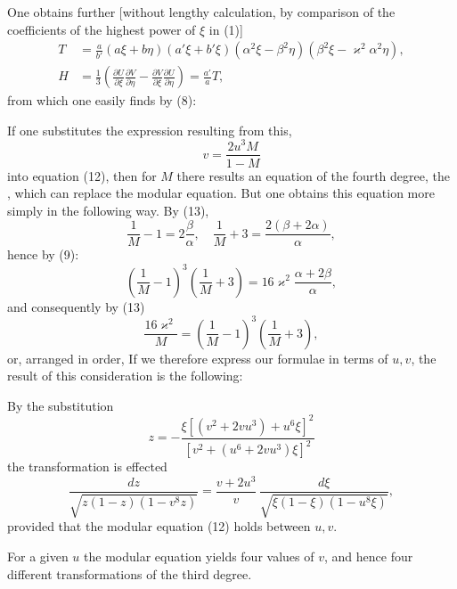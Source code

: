 One obtains further [without lengthy calculation, by comparison of the coefficients of the highest power of $\xi$ in (1)]
\[
\begin{aligned}
T &= \frac{a}{b'}(a\xi+b\eta)(a'\xi+b'\xi)(\alpha^2\xi-\beta^2\eta)(\beta^2\xi-\varkappa^2\alpha^2\eta), %
\\
H &= \frac{1}{3}\left(\frac{\partial U}{\partial \xi}\frac{\partial V}{\partial \eta}-\frac{\partial V}{\partial \xi}\frac{\partial U}{\partial \eta}\right) = \frac{a'}{a}T,
\end{aligned}
\]
from which one easily finds by (8):

If one substitutes the expression resulting from this,
\[
v = \frac{2u^3M}{1-M}
\]
into equation (12), then for $M$ there results an equation of the fourth degree, the , which can replace the modular equation. But one obtains this equation more simply in the following way. By (13),
\[
\frac{1}{M}-1 = 2\frac{\beta}{\alpha}, \quad \frac{1}{M}+3 = \frac{2(\beta+2\alpha)}{\alpha},
\]
hence by (9):
\[
\left(\frac{1}{M}-1\right)^3\left(\frac{1}{M}+3\right) = 16\varkappa^2\frac{\alpha+2\beta}{\alpha},
\]
and consequently by (13)
\[
\frac{16\varkappa^2}{M} = \left(\frac{1}{M}-1\right)^3\left(\frac{1}{M}+3\right),
\]
or, arranged in order,
If we therefore express our formulae in terms of $u, v$, the result of this consideration is the following:

By the substitution
\[
z = -\frac{\xi[(v^2+2vu^3)+u^6\xi]^2}{[v^2+(u^6+2vu^3)\xi]^2}
\]
the transformation is effected
\[
\frac{dz}{\sqrt{z(1-z)(1-v^8z)}} = \frac{v+2u^3}{v}\,\frac{d\xi}{\sqrt{\xi(1-\xi)(1-u^8\xi)}},
\]
provided that the modular equation (12) holds between $u, v$.

For a given $u$ the modular equation yields four values of $v$, and hence four different transformations of the third degree.

